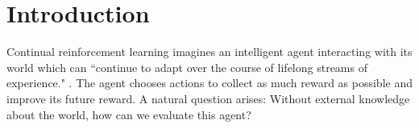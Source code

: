 \section{Introduction}
\label{sec:intro}





Continual reinforcement learning imagines an intelligent agent interacting with its world which can 
``continue to adapt over the course of lifelong streams of experience." \citep{silver2025welcome}.
The agent chooses actions to collect  as much reward as possible and improve its future reward. A natural question arises: Without external knowledge about the world, how can we evaluate this agent? 

